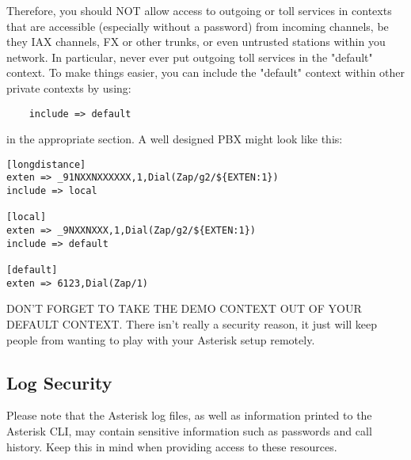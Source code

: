 Therefore, you should NOT allow access to outgoing or toll services in
contexts that are accessible (especially without a password) from incoming
channels, be they IAX channels, FX or other trunks, or even untrusted
stations within you network.  In particular, never ever put outgoing toll
services in the "default" context.  To make things easier, you can include
the "default" context within other private contexts by using:

\begin{astlisting}
\begin{verbatim}
	include => default
\end{verbatim}
\end{astlisting}

in the appropriate section.  A well designed PBX might look like this:

\begin{astlisting}
\begin{verbatim}
[longdistance]
exten => _91NXXNXXXXXX,1,Dial(Zap/g2/${EXTEN:1})
include => local

[local]
exten => _9NXXNXXX,1,Dial(Zap/g2/${EXTEN:1})
include => default

[default]
exten => 6123,Dial(Zap/1)
\end{verbatim}
\end{astlisting}

DON'T FORGET TO TAKE THE DEMO CONTEXT OUT OF YOUR DEFAULT CONTEXT.  There
isn't really a security reason, it just will keep people from wanting to
play with your Asterisk setup remotely.

\subsection{Log Security}

Please note that the Asterisk log files, as well as information printed to the
Asterisk CLI, may contain sensitive information such as passwords and call
history.  Keep this in mind when providing access to these resources.

